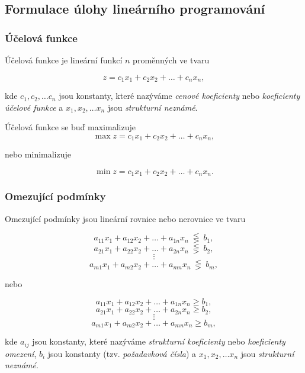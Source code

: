 \subsection{Formulace úlohy lineárního programování}

\subsubsection{Účelová funkce}


Účelová funkce je lineární funkcí $n$ proměnných ve tvaru

\begin{equation}
    z = c_1x_1 + c_2x_2 + \ldots + c_nx_n ,
\end{equation}


kde $c_1, c_2, \ldots c_n$ jsou konstanty, které nazýváme \textit{cenové koeficienty} nebo \textit{koeficienty účelové funkce} a 
$x_1, x_2, \ldots x_n$ jsou \textit{strukturní neznámé}.

Účelová funkce se buď maximalizuje
\begin{equation}
    \max z = c_1x_1 + c_2x_2 + \ldots + c_nx_n ,
\end{equation}

nebo minimalizuje

\begin{equation}
    \min z = c_1x_1 + c_2x_2 + \ldots + c_nx_n .
\end{equation}

\subsubsection{Omezující podmínky}

Omezující podmínky jsou lineární rovnice nebo nerovnice ve tvaru


$$ a_{11}x_1 + a_{12}x_2 + \ldots + a_{1n}x_n \ \lesseqgtr \ b_1 ,$$
$$ a_{21}x_1 + a_{22}x_2 + \ldots + a_{2n}x_n \ \lesseqgtr \ b_2 ,$$
$$ \vdots $$
$$ a_{m1}x_1 + a_{m2}x_2 + \ldots + a_{mn}x_n \ \lesseqgtr \ b_m ,$$

nebo

$$ a_{11}x_1 + a_{12}x_2 + \ldots + a_{1n}x_n \geq b_1 ,$$
$$ a_{21}x_1 + a_{22}x_2 + \ldots + a_{2n}x_n \geq b_2 ,$$
$$ \vdots $$
$$ a_{m1}x_1 + a_{m2}x_2 + \ldots + a_{mn}x_n \geq b_m ,$$

kde $a_{ij}$ jsou konstanty, které nazýváme \textit{strukturní koeficienty} nebo \textit{koeficienty omezení}, $b_i$ jsou konstanty (tzv. \textit{požadavková čísla})
a $x_1, x_2, \ldots x_n$ jsou \textit{strukturní neznámé}.

